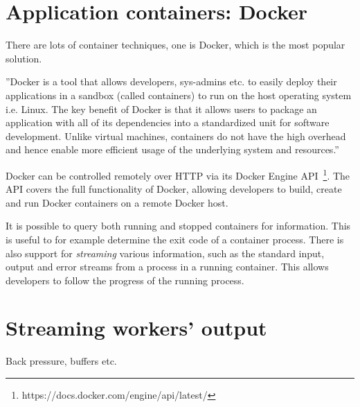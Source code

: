 \section{Application containers: Docker}


There are lots of container techniques, one is Docker, which is the most popular solution. %

''Docker is a tool that allows developers, sys-admins etc. to easily deploy their applications in a sandbox (called containers) to run on the host operating system i.e. Linux. The key benefit of Docker is that it allows users to package an application with all of its dependencies into a standardized unit for software development. Unlike virtual machines, containers do not have the high overhead and hence enable more efficient usage of the underlying system and resources.''~\cite{2019ABeginners}


Docker can be controlled remotely over HTTP via its Docker Engine API~\footnote{https://docs.docker.com/engine/api/latest/}. The API covers the full functionality of Docker, allowing developers to build, create and run Docker containers on a remote Docker host. 

It is possible to query both running and stopped containers for information. This is useful to for example determine the exit code of a container process. There is also support for \textit{streaming} various information, such as the standard input, output and error streams from a process in a running container. This allows developers to follow the progress of the running process.

\section{Streaming workers' output}

Back pressure, buffers etc.

